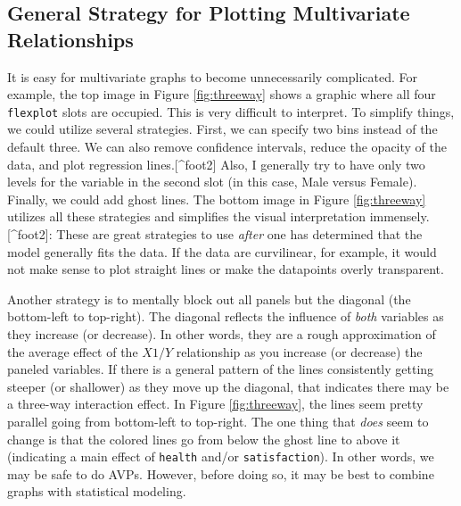 \documentclass[
  english,
  man]{apa6}
\begin{document}
\normalsize

\hypertarget{general-strategy-for-plotting-multivariate-relationships}{%
\subsection{General Strategy for Plotting Multivariate Relationships}\label{general-strategy-for-plotting-multivariate-relationships}}

It is easy for multivariate graphs to become unnecessarily complicated. For example, the top image in Figure \ref{fig:threeway} shows a graphic where all four \texttt{flexplot} slots are occupied. This is very difficult to interpret. To simplify things, we could utilize several strategies. First, we can specify two bins instead of the default three. We can also remove confidence intervals, reduce the opacity of the data, and plot regression lines.{[}\^{}foot2{]} Also, I generally try to have only two levels for the variable in the second slot (in this case, Male versus Female). Finally, we could add ghost lines. The bottom image in Figure \ref{fig:threeway} utilizes all these strategies and simplifies the visual interpretation immensely.
{[}\^{}foot2{]}: These are great strategies to use \emph{after} one has determined that the model generally fits the data. If the data are curvilinear, for example, it would not make sense to plot straight lines or make the datapoints overly transparent.

Another strategy is to mentally block out all panels but the diagonal (the bottom-left to top-right). The diagonal reflects the influence of \emph{both} variables as they increase (or decrease). In other words, they are a rough approximation of the average effect of the \(X1/Y\) relationship as you increase (or decrease) the paneled variables. If there is a general pattern of the lines consistently getting steeper (or shallower) as they move up the diagonal, that indicates there may be a three-way interaction effect. In Figure \ref{fig:threeway}, the lines seem pretty parallel going from bottom-left to top-right. The one thing that \emph{does} seem to change is that the colored lines go from below the ghost line to above it (indicating a main effect of \texttt{health} and/or \texttt{satisfaction}). In other words, we may be safe to do AVPs. However, before doing so, it may be best to combine graphs with statistical modeling.

\small
\end{document}

